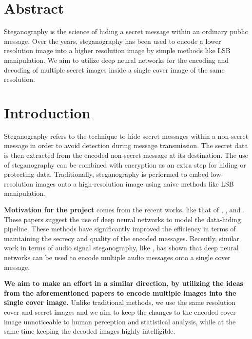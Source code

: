 \documentclass{article}
\begin{document}

\section{Abstract}
\label{submission}
Steganography is the science of hiding a secret message within an ordinary public message. Over the years, steganography has been used to encode a lower resolution image into a higher resolution image by simple methods like LSB manipulation. We aim to utilize deep neural networks for the encoding and decoding of multiple secret images inside a single cover image of the same resolution.


\section{Introduction}
\label{submission}

Steganography refers to the technique to hide secret messages within a non-secret message in order to avoid detection during message transmission. The secret data is then extracted from the encoded non-secret message at its destination. The use of steganography can be combined with encryption as an extra step for hiding or protecting data. Traditionally, steganography is performed to embed low-resolution images onto a high-resolution image using naive methods like LSB manipulation.

\textbf{Motivation for the project} comes from the recent works, like that of \cite{NIPS2017_6802}, \cite{Hayes2017GeneratingSI}, and \cite{DBLP:journals/corr/abs-1807-09937}. These papers suggest the use of deep neural networks to model the data-hiding pipeline. These methods have significantly improved the efficiency in terms of maintaining the secrecy and quality of the encoded messages. Recently, similar work in terms of audio signal steganography, like \cite{kreuk2019hide}, has shown that deep neural networks can be used to encode multiple audio messages onto a single cover message. 

\textbf{We aim to make an effort in a similar direction, by utilizing the ideas from the aforementioned papers to encode multiple images into the single cover image.} Unlike traditional methods, we use the same resolution cover and secret images and we aim to keep the changes to the encoded cover image unnoticeable to human perception and statistical analysis, while at the same time keeping the decoded images highly intelligible.
\end{document}
